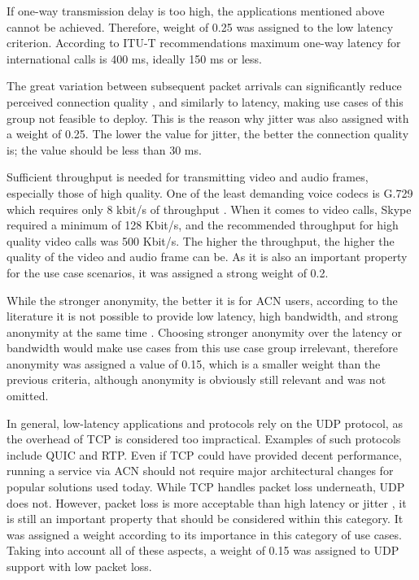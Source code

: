 If one-way transmission delay is too high, the applications mentioned above cannot be achieved. Therefore, weight of 0.25 was assigned to the low latency criterion. According to ITU-T recommendations \cite{ITU-G.114} maximum one-way latency for international calls is 400 ms, ideally 150 ms or less.

The great variation between subsequent packet arrivals can significantly reduce perceived connection quality \cite{voip-tor}, and similarly to latency,  making use cases of this group not feasible to deploy. This is the reason why jitter was also assigned with a weight of 0.25. The lower the value for jitter, the better the connection quality is; the value should be less than 30 ms.

Sufficient throughput is needed for transmitting video and audio frames, especially those of high quality. One of the least demanding voice codecs is G.729 which requires only 8 kbit/s of throughput \cite{ITU-G.729}. When it comes to video calls, Skype required \cite{microsoft-skype-bandwidth} a minimum of 128 Kbit/s, and the recommended throughput for high quality video calls was 500 Kbit/s. The higher the throughput, the higher the quality of the video and audio frame can be. As it is also an important property for the use case scenarios, it was assigned a strong weight of 0.2.

While the stronger anonymity, the better it is for ACN users, according to the literature it is not possible to provide low latency, high bandwidth, and strong anonymity at the same time \cite{anonymity-trillema}. Choosing stronger anonymity over the latency or bandwidth would make use cases from this use case group irrelevant, therefore anonymity was assigned a value of 0.15, which is a smaller weight than the previous criteria, although anonymity is obviously still relevant and was not omitted.

In general, low-latency applications and protocols rely on the UDP protocol, as the overhead of TCP is considered too impractical. Examples of such protocols include QUIC and RTP. Even if TCP could have provided decent performance, running a service via ACN should not require major architectural changes for popular solutions used today. While TCP handles packet loss underneath, UDP does not. However, packet loss is more acceptable than high latency or jitter \cite{voip-tor}, it is still an important property that should be considered within this category. It was assigned a weight according to its importance in this category of use cases.  Taking into account all of these aspects, a weight of 0.15 was assigned to UDP support with low packet loss.

